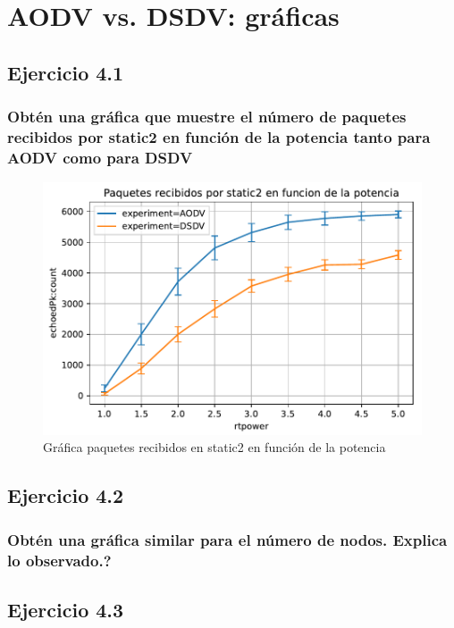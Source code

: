 \chapter{AODV vs. DSDV: gráficas}
\label{chap:aodv_dsdv_graf}


\section{Ejercicio 4.1}
\subsection{Obtén una gráfica que muestre el número de paquetes recibidos por static2 en función de la potencia tanto
para AODV como para DSDV}

\begin{figure}[H]
    \centering
    \includegraphics{imaxes/graficas/ejer4_1.pdf}
    \caption{Gráfica paquetes recibidos en static2 en función de la potencia}
    \label{fig:ejer4_1}
\end{figure}

\section{Ejercicio 4.2}

\subsection{Obtén una gráfica similar para el número de nodos. Explica lo observado.?}

\section{Ejercicio 4.3}

